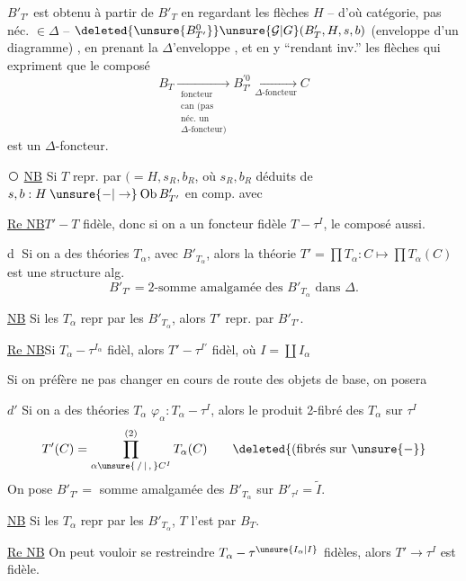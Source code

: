 $B'_{T'}$ est obtenu à partir de $B'_T$ en regardant les flèches $H$ -- d'où catégorie, pas néc. $\in\Delta$ -- $\deleted{\unsure{B^{0}_{T'}}}\unsure{\mathcal G|G}(B'_T,H,s,b)$ (enveloppe d'un  diagramme) , en prenant la $\Delta$'enveloppe , et en y ``rendant inv.''  les flèches qui expriment que le composé
\[
 B_T\xrightarrow[\substack{\text{foncteur}\\\text{can (pas}\\\text{néc. un}\\\Delta\text{-foncteur)}}]{}B^{\prime0}_{T'}
 \xrightarrow[\Delta\text{-foncteur}]{}C
\]
est un $\Delta$-foncteur.

\textcircled{\unsure{$*$}} \uline{NB} Si $T$ repr. par  $(=H,s_R,b_R$, où $s_R,b_R$ déduits de $s,b:H\mathbin{\unsure{-|\to}}\mathrm{Ob}\,B'_{T'}$ en comp. avec

\uline{Re NB}\quad $T'\mathbin{-}T$ fidèle, donc si on a un foncteur fidèle $T\mathbin{-}\tau^I$, le composé aussi.

\textcircled{d}  Si on a des  théories $T_\alpha$, avec $B'_{T_\alpha}$, alors la théorie $T'=\prod T_\alpha:C\mapsto\prod T_\alpha(C)$ est une structure alg.
\[
 B'_{T'}=\text{2-somme amalgamée des } B'_{T_\alpha}\text{ dans }\Delta .
\]

\uline{NB} Si les $T_\alpha$ repr par les $B'_{T_\alpha}$, alors $T'$ repr. par  $B'_{T'}$.

\uline{Re NB}\quad Si $T_\alpha\mathbin{-}\tau^{I_\alpha}$ fidèl, alors $T'\mathbin{-}\tau^{I'}$ fidèl, où $I=\coprod I_\alpha$

Si on préfère ne pas changer en cours de route des objets de base, on posera

\textcircled{$d'$}  Si on a des théories $T_\alpha$  $\varphi_\alpha:T_\alpha\mathbin{-}\tau^I$, alors le produit 2-fibré des $T_\alpha$ sur $\tau^I$
\[
 T'(C)=\prod_{\alpha\unsure{\,/\,|\,,\,}C^I}^{(2)}T_\alpha(C)
 \qquad\deleted{\text{(fibrés sur }\unsure{-}}
\]
 On pose $B'_{T'}=$  somme amalgamée des $B'_{T_\alpha}$ sur $B'_{\tau^I}=\widetilde I$.

\uline{NB} Si les $T_\alpha$ repr par les $B'_{T_\alpha}$, $T$ l'est par $B_T$.

\uline{Re NB}  On peut vouloir se restreindre  $T_\alpha\mathbin{-}\tau^{\unsure{I_\alpha|I}}$ fidèles, alors $T'\to\tau^I$ est fidèle.
